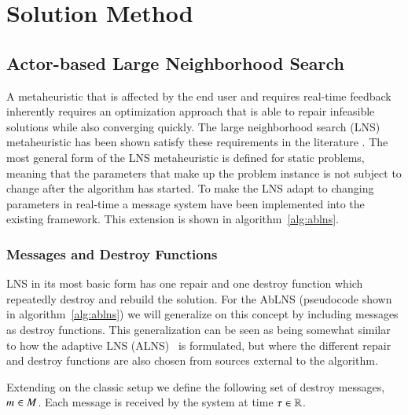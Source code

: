 \section{Solution Method}\label{sec:2-solution-method}

\subsection{Actor-based Large Neighborhood Search} 
A metaheuristic that is affected by the end user and requires real-time
feedback inherently requires an optimization approach that is able to repair
infeasible solutions while also converging quickly. The large neighborhood
search (LNS)~\citep{shaw1998using} metaheuristic has been shown satisfy these
requirements in the literature \citep{gendreauHandbookMetaheuristics2019lnschapter}.
The most general form of the LNS metaheuristic is defined for static
problems, meaning that the parameters that make up the problem instance
is not subject to change after the algorithm has started. To make the
LNS adapt to changing parameters in real-time a message system have been
implemented into the existing framework. This  extension is shown in 
algorithm~\ref{alg:ablns}.

\subsubsection{Messages and Destroy Functions}
LNS in its most basic form has one repair and one destroy function which
repeatedly destroy and rebuild the solution. For the AbLNS (pseudocode shown in
algorithm~\ref{alg:ablns}) we will
generalize on this concept by including messages as destroy functions. This
generalization can be seen as being somewhat similar to how the adaptive
LNS (ALNS)~\citep{pisinger2007general} is formulated, but where the different
repair and destroy functions are also chosen from sources external to the
algorithm.

Extending on the classic setup we define the following set of 
destroy messages, $m_{}^{} \in M$. Each
message is received by the system at time $\tau \in \mathbb{R}$.

